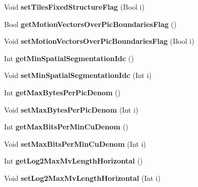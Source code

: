 \begin{DoxyCompactItemize}
\item 
\mbox{\label{class_t_enc_cfg_a4e8fd9f9930bb24aa08b4841c71a49e6}} 
Void {\bfseries set\+Tiles\+Fixed\+Structure\+Flag} (Bool i)
\item 
\mbox{\label{class_t_enc_cfg_a9a1e6e3aeca924ad97bc4c79fa35845a}} 
Bool {\bfseries get\+Motion\+Vectors\+Over\+Pic\+Boundaries\+Flag} ()
\item 
\mbox{\label{class_t_enc_cfg_a6a4924dda3ae3fe8a309aa925d867d75}} 
Void {\bfseries set\+Motion\+Vectors\+Over\+Pic\+Boundaries\+Flag} (Bool i)
\item 
\mbox{\label{class_t_enc_cfg_aa6814dff3802393af678c1f71310678f}} 
Int {\bfseries get\+Min\+Spatial\+Segmentation\+Idc} ()
\item 
\mbox{\label{class_t_enc_cfg_a68c05abf7f65007fffd556559955dea7}} 
Void {\bfseries set\+Min\+Spatial\+Segmentation\+Idc} (Int i)
\item 
\mbox{\label{class_t_enc_cfg_a1e205b2d3bd731d53816be7d0c856471}} 
Int {\bfseries get\+Max\+Bytes\+Per\+Pic\+Denom} ()
\item 
\mbox{\label{class_t_enc_cfg_a3eba609a1f57a560ec71166b4e7068d2}} 
Void {\bfseries set\+Max\+Bytes\+Per\+Pic\+Denom} (Int i)
\item 
\mbox{\label{class_t_enc_cfg_a9ff68e49da16f1db58f32c19b47c2106}} 
Int {\bfseries get\+Max\+Bits\+Per\+Min\+Cu\+Denom} ()
\item 
\mbox{\label{class_t_enc_cfg_a8d80efe02c0493d492d87f5d1426761d}} 
Void {\bfseries set\+Max\+Bits\+Per\+Min\+Cu\+Denom} (Int i)
\item 
\mbox{\label{class_t_enc_cfg_a5a6696f6c5a3b01a461bdb2b40bac7d2}} 
Int {\bfseries get\+Log2\+Max\+Mv\+Length\+Horizontal} ()
\item 
\mbox{\label{class_t_enc_cfg_a3b95606cd012a58f11de18c769f75aa5}} 
Void {\bfseries set\+Log2\+Max\+Mv\+Length\+Horizontal} (Int i)

\end{DoxyCompactItemize}
